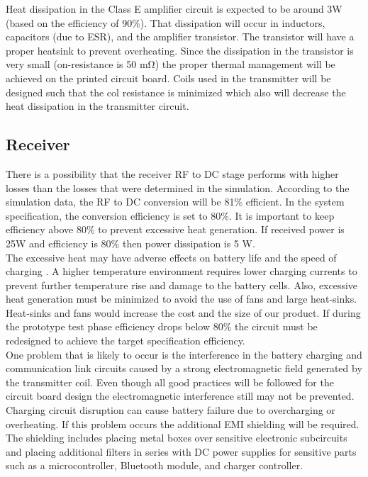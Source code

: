 \documentclass[12pt]{article}
\begin{document}
\indent
Heat dissipation in the Class E amplifier circuit is expected to be around 3W (based on the efficiency of 90\%). That dissipation will occur in inductors, capacitors (due to ESR), and the amplifier transistor. The transistor will have a proper heatsink to prevent overheating. Since the dissipation in the transistor is very small (on-resistance is 50 mΩ) the proper thermal management will be achieved on the printed circuit board. Coils used in the transmitter will be designed such that the col resistance is minimized which also will decrease the heat dissipation in the transmitter circuit.

\subsection{Receiver}

\noindent \noindent
There is a possibility that the receiver RF to DC stage performs with higher losses than the losses that were determined in the simulation. According to the simulation data, the RF to DC conversion will be 81\% efficient. In the system specification, the conversion efficiency is set to 80\%. It is important to keep efficiency above 80\% to prevent excessive heat generation. If received power is 25W and efficiency is  80\% then power dissipation is 5 W.   \\

\indent
The excessive heat may have adverse effects on battery life and the speed of charging \cite{TPSM265R1}. A higher temperature environment requires lower charging currents to prevent further temperature rise and damage to the battery cells. Also, excessive heat generation must be minimized to avoid the use of fans and large heat-sinks. Heat-sinks and fans would increase the cost and the size of our product.   If during the prototype test phase efficiency drops below 80\% the circuit must be redesigned to achieve the target specification efficiency. \\

\indent
One problem that is likely to occur is the interference in the battery charging and communication link circuits caused by a strong electromagnetic field generated by the transmitter coil. Even though all good practices will be followed for the circuit board design the electromagnetic interference still may not be prevented. Charging circuit disruption can cause battery failure due to overcharging or overheating. If this problem occurs the additional EMI shielding will be required. The shielding includes placing metal boxes over sensitive electronic subcircuits and placing additional filters in series with DC power supplies for sensitive parts such as a microcontroller, Bluetooth module, and charger controller.
\end{document}
